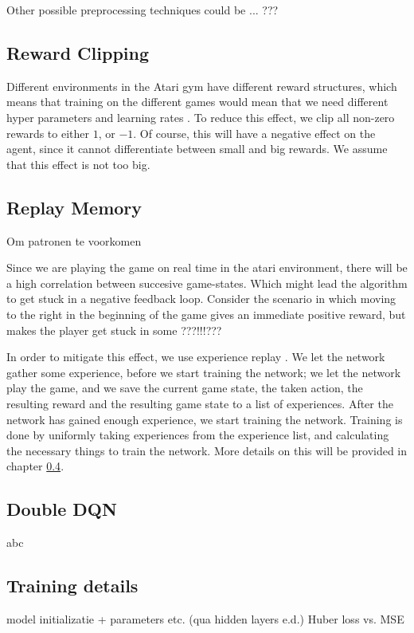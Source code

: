 \documentclass{article}
\begin{document}
Other possible preprocessing techniques could be ... ???

\subsection{Reward Clipping}

Different environments in the Atari gym have different reward structures, which means that training on the different games would mean that we need different hyper parameters and learning rates . To reduce this effect, we clip all non-zero rewards to either $1$, or $-1$. Of course, this will have a negative effect on the agent, since it cannot differentiate between small and big rewards. We assume that this effect is not too big\cite{mnih2015human}.


\subsection{Replay Memory}
Om patronen te voorkomen \cite{mnih2013playing}

Since we are playing the game on real time in the atari environment, there will be a high correlation between succesive game-states. Which might lead the algorithm to get stuck in a negative feedback loop. Consider the scenario in which moving to the right in the beginning of the game gives an immediate positive reward, but makes the player get stuck in some ???!!!???

In order to mitigate this effect, we use experience replay \cite{mnih2013playing}. We let the network gather some experience, before we start training the network; we let the network play the game, and we save the current game state, the taken action, the resulting reward and the resulting game state to a list of experiences. After the network has gained enough experience, we start training the network. Training is done by uniformly taking experiences from the experience list, and calculating the necessary things to train the network. More details on this will be provided in  chapter \ref{chapter:training}.

\subsection{Double DQN}

abc

\subsection{Training details} \label{chapter:training}
model initializatie + parameters etc. (qua hidden layers e.d.)
Huber loss vs. MSE
\end{document}
